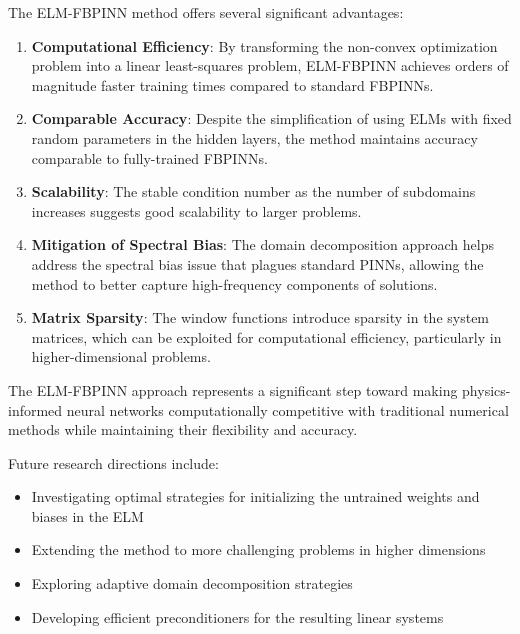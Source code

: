 \documentclass[11pt]{article}
\begin{document}
The ELM-FBPINN method offers several significant advantages:

\begin{enumerate}
    \item \textbf{Computational Efficiency}: By transforming the non-convex optimization problem into a linear least-squares problem, ELM-FBPINN achieves orders of magnitude faster training times compared to standard FBPINNs.
    
    \item \textbf{Comparable Accuracy}: Despite the simplification of using ELMs with fixed random parameters in the hidden layers, the method maintains accuracy comparable to fully-trained FBPINNs.
    
    \item \textbf{Scalability}: The stable condition number as the number of subdomains increases suggests good scalability to larger problems.
    
    \item \textbf{Mitigation of Spectral Bias}: The domain decomposition approach helps address the spectral bias issue that plagues standard PINNs, allowing the method to better capture high-frequency components of solutions.
    
    \item \textbf{Matrix Sparsity}: The window functions introduce sparsity in the system matrices, which can be exploited for computational efficiency, particularly in higher-dimensional problems.
\end{enumerate}

The ELM-FBPINN approach represents a significant step toward making physics-informed neural networks computationally competitive with traditional numerical methods while maintaining their flexibility and accuracy.

Future research directions include:
\begin{itemize}
    \item Investigating optimal strategies for initializing the untrained weights and biases in the ELM
    \item Extending the method to more challenging problems in higher dimensions
    \item Exploring adaptive domain decomposition strategies
    \item Developing efficient preconditioners for the resulting linear systems
\end{itemize}
\end{document}
